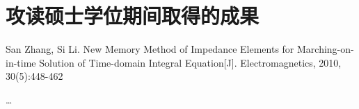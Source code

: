 \chapter*{攻读硕士学位期间取得的成果}

\begin{enumerate}[ {[}1{]} ]
\item
San Zhang, Si Li. New Memory Method of Impedance Elements for Marching-on-in-time
Solution of Time-domain Integral Equation[J]. Electromagnetics, 2010, 30(5):448-462
\item \ldots
\end{enumerate}

